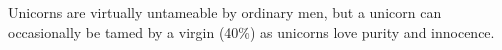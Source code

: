 \begin{multicols}{2}
\begin{description}
\setlength\itemsep{0pt}

\item[Comments] Unicorns are virtually untameable by ordinary men, but a
unicorn can occasionally be tamed by a virgin (40\%) as unicorns love
purity and innocence.

\end{description}
\end{multicols}
